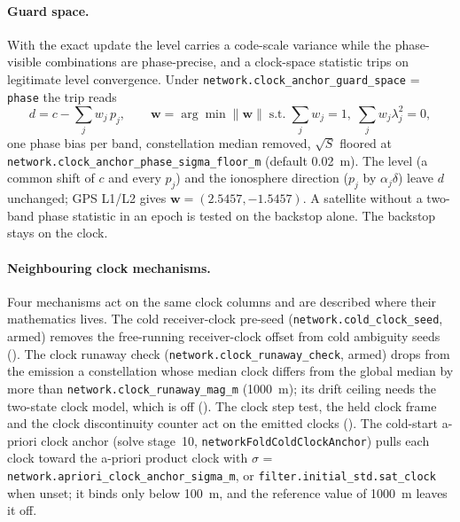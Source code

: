 \documentclass[main.tex]{subfiles}
\begin{document}
\paragraph{Guard space.}
With the exact update the level carries a code-scale variance while the
phase-visible combinations are phase-precise, and a clock-space statistic
trips on legitimate level convergence. Under
\texttt{network.clock\_anchor\_guard\_space} = \texttt{phase} the trip reads
\begin{equation}
d = c - \textstyle\sum_j w_j\,p_j,
\qquad
\bm{w} = \arg\min\|\bm{w}\| \;\text{s.t.}\; \textstyle\sum_j w_j = 1,\;
\textstyle\sum_j w_j\lambda_j^2 = 0,
\label{eq:veh-phiclock}
\end{equation}
one phase bias per band, constellation median removed, $\sqrt{S}$ floored
at \texttt{network.clock\_anchor\_phase\_sigma\_floor\_m} (default 0.02~m).
The level (a common shift of $c$ and every $p_j$) and the ionosphere
direction ($p_j$ by $\alpha_j\delta$) leave $d$ unchanged; GPS L1/L2 gives
$\bm{w} = (2.5457, -1.5457)$. A satellite without a two-band phase
statistic in an epoch is tested on the backstop alone. The backstop stays
on the clock.

\paragraph{Neighbouring clock mechanisms.}
Four mechanisms act on the same clock columns and are described where their
mathematics lives. The cold receiver-clock pre-seed
(\texttt{network.cold\_clock\_seed}, armed) removes the free-running
receiver-clock offset from cold ambiguity seeds
(). The clock
runaway check (\texttt{network.clock\_runaway\_check}, armed) drops from the
emission a constellation whose median clock differs from the global median
by more than \texttt{network.clock\_runaway\_mag\_m} (1000~m); its drift
ceiling needs the two-state clock model, which is off
(). The clock
step test, the held clock frame and the clock discontinuity counter act on
the emitted clocks ().
The cold-start a-priori clock anchor (solve stage~10,
\texttt{networkFoldColdClockAnchor}) pulls each clock toward the a-priori
product clock with $\sigma$ = \texttt{network.apriori\_clock\_anchor\_sigma\_m},
or \texttt{filter.initial\_std.sat\_clock} when unset; it binds only below
\SI{100}{\metre}, and the reference value of \SI{1000}{\metre} leaves it
off.
\end{document}
